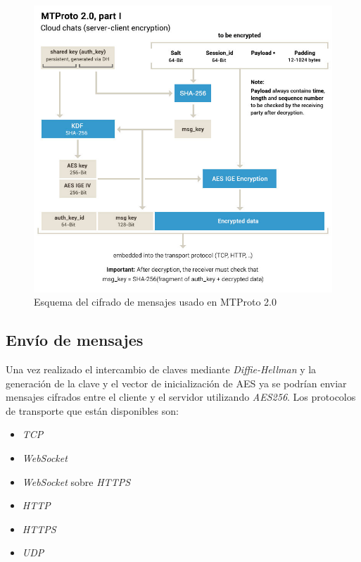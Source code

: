 \newpage
\begin{figure}[htb]
	\centering
	\includegraphics[scale=0.4]{imagenes/diagramaMTProto.jpg} 
	\caption{Esquema del cifrado de mensajes usado en MTProto 2.0}
	\label{mtproto2}
\end{figure}

\subsection{Envío de mensajes}
Una vez realizado el intercambio de claves mediante \emph{Diffie-Hellman} y la generación de la clave y el vector de inicialización de AES ya se podrían enviar mensajes cifrados entre el cliente y el servidor utilizando \emph{AES256}.
Los protocolos de transporte que están disponibles son:
\begin{itemize}
	\item \emph{TCP}
	\item \emph{WebSocket}
	\item \emph{WebSocket} sobre \emph{HTTPS}
	\item \emph{HTTP}
	\item \emph{HTTPS}
	\item \emph{UDP}
\end{itemize}

